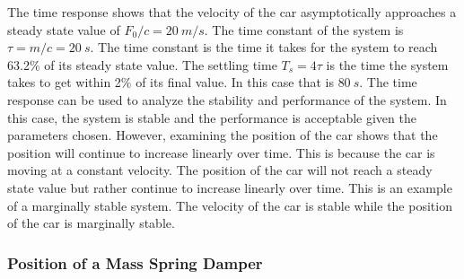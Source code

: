 \noindent The time response shows that the velocity of the car asymptotically approaches a steady state value of $F_0/c = 20~m/s$. The time constant of the system is $\tau = m/c = 20~s$. The time constant is the time it takes for the system to reach 63.2\% of its steady state value. The settling time $T_s=4\tau$ is the time the system takes to get within 2\% of its final value. In this case that is $80~s$. The time response can be used to analyze the stability and performance of the system. In this case, the system is stable and the performance is acceptable given the parameters chosen. However, examining the position of the car shows that the position will continue to increase linearly over time. This is because the car is moving at a constant velocity. The position of the car will not reach a steady state value but rather continue to increase linearly over time. This is an example of a marginally stable system. The velocity of the car is stable while the position of the car is marginally stable.

\subsubsection{Position of a Mass Spring Damper}

